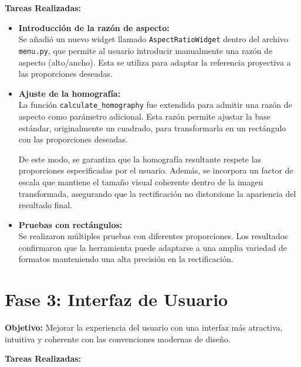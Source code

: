 \vspace{\baselineskip}

\textbf{Tareas Realizadas:}

\begin{itemize}
    \item \textbf{Introducción de la razón de aspecto:} \\
    Se añadió un nuevo widget llamado \texttt{AspectRatioWidget} dentro del archivo \texttt{menu.py}, que permite al usuario introducir manualmente una razón de aspecto (alto/ancho). Esta se utiliza para adaptar la referencia proyectiva a las proporciones deseadas.
    
    \item \textbf{Ajuste de la homografía:} \\
    La función \texttt{calculate\_homography} fue extendida para admitir una razón de aspecto como parámetro adicional. Esta razón permite ajustar la base estándar, originalmente un cuadrado, para transformarla en un rectángulo con las proporciones deseadas.
    
    De este modo, se garantiza que la homografía resultante respete las proporciones especificadas por el usuario. Además, se incorpora un factor de escala que mantiene el tamaño visual coherente dentro de la imagen transformada, asegurando que la rectificación no distorsione la apariencia del resultado final.
    
    \item \textbf{Pruebas con rectángulos:} \\
    Se realizaron múltiples pruebas con diferentes proporciones. Los resultados confirmaron que la herramienta puede adaptarse a una amplia variedad de formatos manteniendo una alta precisión en la rectificación.
\end{itemize}

\section{Fase 3: Interfaz de Usuario}

\textbf{Objetivo:} Mejorar la experiencia del usuario con una interfaz más atractiva, intuitiva y coherente con las convenciones modernas de diseño.

\textbf{Tareas Realizadas:}

